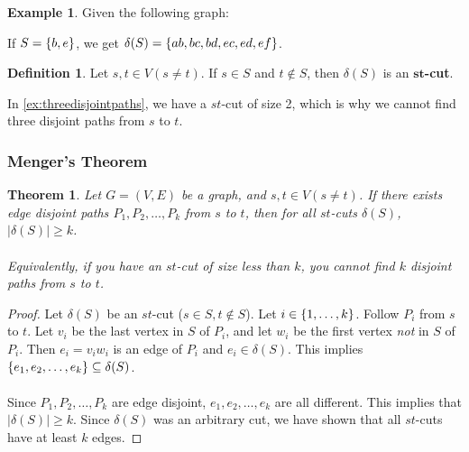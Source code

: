 \documentclass[]{article}
\newtheorem*{theorem}{Theorem}
\theoremstyle{definition}
\newtheorem*{defn}{Definition}
\newtheorem{ex}{Example}[section]
\DeclarePairedDelimiter{\set}{\lbrace}{\rbrace}
\begin{document}
			\begin{ex}
				Given the following graph:
				\begin{center}
				\end{center}
				
				If $S = \set{b, e}$, we get $\delta(S) = \set{ab, bc, bd, ec, ed, ef}$.
			\end{ex}

			\begin{defn}
				Let $s, t \in V (s \ne t)$. If $s \in S$ and $t \not \in S$, then $\delta(S)$ is an \textbf{$\mathbf{st}$-cut}.
			\end{defn}
			
			In \ref{ex:threedisjointpaths}, we have a $st$-cut of size 2, which is why we cannot find three disjoint paths from $s$ to $t$.

			\subsubsection{Menger's Theorem}
				\begin{theorem}
					Let $G = (V, E)$ be a graph, and $s, t \in V (s \ne t)$. If there exists edge disjoint paths $P_1, P_2, \ldots, P_k$ from $s$ to $t$, then for all $st$-cuts $\delta(S)$, $|\delta(S)| \ge k$.
					\\ \\
					Equivalently, if you have an $st$-cut of size less than $k$, you cannot find $k$ disjoint paths from $s$ to $t$.
				\end{theorem}
			
				\begin{proof}
					Let $\delta(S)$ be an $st$-cut ($s \in S, t \not \in S$). Let $i \in \set{1, \ldots, k}$. Follow $P_i$ from $s$ to $t$. Let $v_i$ be the last vertex in $S$ of $P_i$, and let $w_i$ be the first vertex \emph{not} in $S$ of $P_i$. Then $e_i = v_i w_i$ is an edge of $P_i$ and $e_i \in \delta(S)$. This implies $\set{e_1, e_2, \ldots, e_k} \subseteq \delta(S)$.
					\\ \\
					Since $P_1, P_2, \ldots, P_k$ are edge disjoint, $e_1, e_2, \ldots, e_k$ are all different. This implies that $|\delta(S)| \ge k$. Since $\delta(S)$ was an arbitrary cut, we have shown that all $st$-cuts have at least $k$ edges.
				\end{proof}
			
\end{document}
